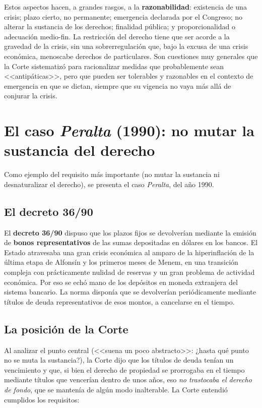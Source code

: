 \documentclass[12pt,oneside]{book}
\begin{document}
\begin{important}
Estos aspectos hacen, a grandes rasgos, a la \textbf{razonabilidad}: existencia de una crisis; plazo cierto, no permanente; emergencia declarada por el Congreso; no alterar la sustancia de los derechos; finalidad pública; y proporcionalidad o adecuación medio-fin. La restricción del derecho tiene que ser acorde a la gravedad de la crisis, sin una sobrerregulación que, bajo la excusa de una crisis económica, menoscabe derechos de particulares. Son cuestiones muy generales que la Corte sistematizó para racionalizar medidas que probablemente sean <<antipáticas>>, pero que pueden ser tolerables y razonables en el contexto de emergencia en que se dictan, siempre que su vigencia no vaya más allá de conjurar la crisis.
\end{important}

\section{El caso \textit{Peralta} (1990): no mutar la sustancia del derecho}

Como ejemplo del requisito más importante (no mutar la sustancia ni desnaturalizar el derecho), se presenta el caso \textit{Peralta}, del año 1990.

\subsection{El decreto 36/90}

El \textbf{decreto 36/90} dispuso que los plazos fijos se devolverían mediante la emisión de \textbf{bonos representativos} de las sumas depositadas en dólares en los bancos. El Estado atravesaba una gran crisis económica al amparo de la hiperinflación de la última etapa de Alfonsín y los primeros meses de Menem, en una transición compleja con prácticamente nulidad de reservas y un gran problema de actividad económica. Por eso se echó mano de los depósitos en moneda extranjera del sistema bancario. La norma disponía que se devolverían periódicamente mediante títulos de deuda representativos de esos montos, a cancelarse en el tiempo.

\subsection{La posición de la Corte}

Al analizar el punto central (<<suena un poco abstracto>>: ¿hasta qué punto no se muta la sustancia?), la Corte dijo que los títulos de deuda tenían un vencimiento y que, si bien el derecho de propiedad se prorrogaba en el tiempo mediante títulos que vencerían dentro de unos años, eso \textit{no trastocaba el derecho de fondo}, que se mantenía de algún modo inalterable. La Corte entendió cumplidos los requisitos:
\end{document}
